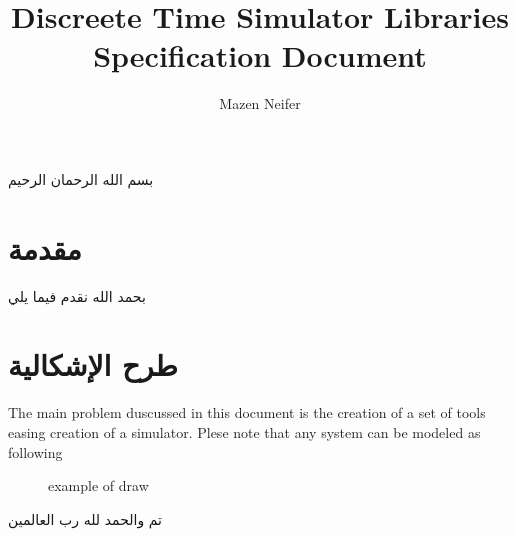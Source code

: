\documentclass[10pt, A4]{article}
\begin{document}
\title{{\bf D}iscreete {\bf T}ime {\bf S}imulator {\bf L}ibraries\\Specification Document}
\author{Mazen Neifer}
\maketitle
\newpage
{}
\begin{center}
{\huge بسم الله الرحمان الرحيم}
\end{center}
\section{مقدمة}
بحمد الله نقدم فيما يلي
\section{طرح الإشكالية}
\begin{otherlanguage}{english}
\par The main problem duscussed in this document is the creation of a set of tools easing creation of a simulator. Plese note that any system can be modeled as following
\begin{figure}[h]
\begin{texdraw}
\end{texdraw}
\caption{example of draw}
\end{figure}
\end{otherlanguage}
\par
تم والحمد لله رب العالمين
\end{document}
